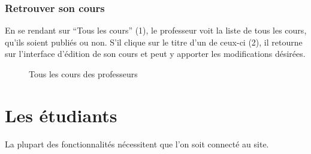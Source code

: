 \documentclass[a4paper,10pt,twoside]{sphinxmanual}
\begin{document}
\subsubsection{Retrouver son cours}
\label{functionalities:retrouver-son-cours}
En se rendant sur ``Tous les cours'' (1), le professeur voit la liste de tous les cours, qu'ils soient publiés ou non. S'il clique sur le titre d'un de ceux-ci (2), il retourne sur l'interface d'édition de son cours et peut y apporter les modifications désirées.
\begin{figure}[htbp]
\centering
\capstart

\caption{Tous les cours des professeurs}\end{figure}


\section{Les étudiants}
\label{functionalities:les-etudiants}
La plupart des fonctionnalités nécessitent que l'on soit connecté au site.
\end{document}
